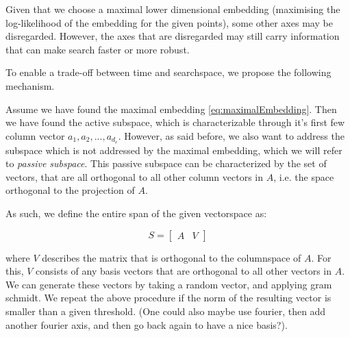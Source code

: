 Given that we choose a maximal lower dimensional embedding (maximising the log-likelihood of the embedding for the given points), some other axes may be disregarded.
However, the axes that are disregarded may still carry information that can make search faster or more robust.

To enable a trade-off between time and searchspace, we propose the following mechanism.


Assume we have found the maximal embedding \ref{eq:maximalEmbedding}.
Then we have found the active subspace, which is characterizable through it's first few column vector $  a_1, a_2, ..., a_{d_e} $.
However, as said before, we also want to address the subspace which is not addressed by the maximal embedding, which we will refer to \textit{passive subspace}.
This passive subspace can be characterized by the set of vectors, that are all orthogonal to all other column vectors in $A$, i.e. the space orthogonal to the projection of $A$.

As such, we define the entire span of the given vectorspace as:

\begin{equation}
S = 
\begin{bmatrix}
A & V
\end{bmatrix}
\label{eq:entireSubspace}
\end{equation}

where $V$ describes the matrix that is orthogonal to the columnspace of $A$.
For this, $V$ consists of any basis vectors that are orthogonal to all other vectors in $A$.\\

We can generate these vectors by taking a random vector, and applying gram schmidt.
We repeat the above procedure if the norm of the resulting vector is smaller than a given threshold.
 (One could also maybe use fourier, then add another fourier axis, and then go back again to have a nice basis?). \\

